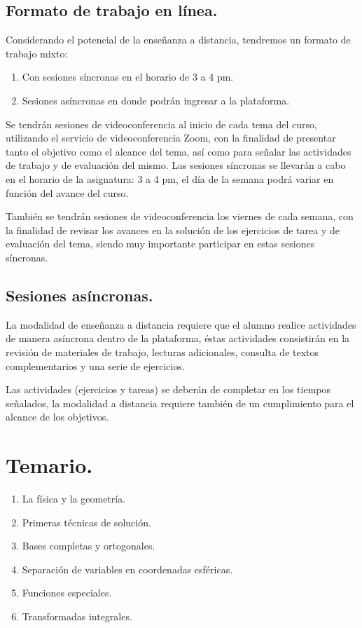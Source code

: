 \documentclass[12pt]{article}
\begin{document}
\subsection{Formato de trabajo en línea.}
Considerando el potencial de la enseñanza a distancia, tendremos un formato de trabajo mixto:
\begin{enumerate}
\item Con sesiones síncronas en el horario de 3 a 4 pm.
\item Sesiones asíncronas en donde podrán ingresar a la plataforma.
\end{enumerate}

Se tendrán sesiones de videoconferencia al inicio de cada tema del curso, utilizando el servicio de videoconferencia Zoom, con la finalidad de presentar tanto el objetivo como el alcance del tema, así como para señalar las actividades de trabajo y de evaluación del mismo. Las sesiones síncronas se llevarán a cabo en el horario de la asignatura: 3 a 4 pm, el día de la semana podrá variar en función del avance del curso. 
\par
También se tendrán sesiones de videoconferencia los viernes de cada semana, con la finalidad de revisar los avances en la solución de los ejercicios de tarea y de evaluación del tema, siendo muy importante participar en estas sesiones síncronas.

\subsection{Sesiones asíncronas.}

La modalidad de enseñanza a distancia requiere que el alumno realice actividades de manera asíncrona dentro de la plataforma, éstas actividades consistirán en la revisión de materiales de trabajo, lecturas adicionales, consulta de textos complementarios y una serie de ejercicios.
\par
Las actividades (ejercicios y tareas) se deberán de completar en los tiempos señalados, la modalidad a distancia requiere también de un cumplimiento para el alcance de los objetivos.

\section{Temario.}
\begin{enumerate}[leftmargin=2cm, label=Tema \arabic*.]
\item La física y la geometría.
\item Primeras técnicas de solución.
\item Bases completas y ortogonales.
\item Separación de variables en coordenadas esféricas.
\item Funciones especiales.
\item Transformadas integrales.
\end{enumerate}
\end{document}
